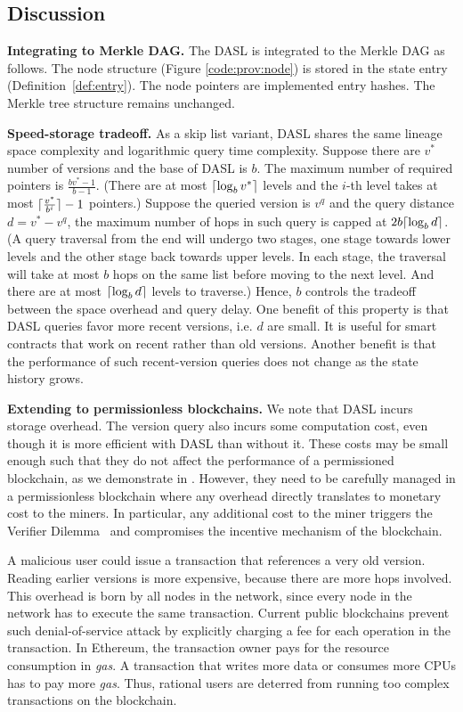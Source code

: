 \subsection{Discussion} \label{sec:provenance:model_discuss}
\textbf{Integrating to Merkle DAG. } 
The DASL is integrated to the Merkle DAG as follows. The node structure (Figure \ref{code:prov:node}) is stored in
the state entry (Definition~\ref{def:entry}).  The node pointers are implemented entry hashes. The Merkle tree
structure remains unchanged.  

\textbf{Speed-storage tradeoff. } 
As a skip list variant, DASL shares the same lineage space complexity and 
logarithmic query time complexity. 
Suppose there are $v^*$ number of versions and the base of DASL is $b$. 
The maximum number of required pointers is $\frac{bv^*-1}{b-1}$. 
(There are at most $\lceil\log_b v^*\rceil$ levels and the $i$-th level takes at most $\lceil\frac{v^*}{b^i}\rceil-1$ pointers.)
Suppose the queried version is $v^q$ and the query distance $d=v^*-v^q$, the maximum number of hops in such query is capped at $2b\lceil\log_b d\rceil$. (A query traversal from the end will undergo two stages, one stage towards lower levels  and the other stage back towards upper levels. In each stage, 
the traversal will take at most $b$ hops on the same list before moving to the next level.
And there are at most $\lceil\log_b d\rceil$ levels to traverse.)
Hence, $b$ controls the tradeoff between the space overhead and query delay. 
One benefit of this property is that DASL queries favor more recent
versions, i.e. $d$ are small.
It is useful for smart contracts that work on recent rather than old versions.  
Another benefit is that the performance of such recent-version queries does not change as the state history grows.  

\textbf{Extending to permissionless blockchains. } 
We note that DASL incurs storage overhead. The version query also incurs some computation cost, even though it
is more efficient with DASL than without it. These costs may be small enough such that they do not
affect the performance of a permissioned blockchain, as we demonstrate in .  However,
they need to be carefully managed in a permissionless blockchain where any overhead directly translates to
monetary cost to the miners. In particular, any additional cost to the miner triggers the Verifier
Dilemma~\cite{luu2015demystifying} and compromises the incentive mechanism of the blockchain.  

A malicious user could issue a transaction that references a very old version. Reading earlier versions is more
expensive, because there are more hops involved. This overhead is born by all nodes in the network,
since every node in the network has to execute the same transaction. Current public blockchains prevent such
denial-of-service attack by explicitly charging a fee for each operation in the transaction. In Ethereum, the
transaction owner pays for the resource consumption in {\em gas}. A transaction that writes more data or
consumes more CPUs has to pay more {\em gas}. Thus, rational users are deterred from running too complex
transactions on the blockchain. 

